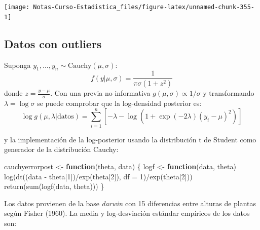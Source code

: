 \documentclass[
  12pt,
]{book}
\newenvironment{Shaded}{\begin{snugshade}}{\end{snugshade}}
\newcommand{\AttributeTok}[1]{\textcolor[rgb]{0.77,0.63,0.00}{#1}}
\newcommand{\ControlFlowTok}[1]{\textcolor[rgb]{0.13,0.29,0.53}{\textbf{#1}}}
\newcommand{\DecValTok}[1]{\textcolor[rgb]{0.00,0.00,0.81}{#1}}
\newcommand{\FunctionTok}[1]{\textcolor[rgb]{0.00,0.00,0.00}{#1}}
\newcommand{\NormalTok}[1]{#1}
\newcommand{\OtherTok}[1]{\textcolor[rgb]{0.56,0.35,0.01}{#1}}
\newcommand{\SpecialCharTok}[1]{\textcolor[rgb]{0.00,0.00,0.00}{#1}}
\theoremstyle{definition}
\theoremstyle{definition}
\theoremstyle{definition}
\theoremstyle{definition}
\theoremstyle{remark}
\begin{document}
\begin{center}\texttt{[image: Notas-Curso-Estadistica\_files/figure-latex/unnamed-chunk-355-1]} \end{center}

\hypertarget{datos-con-outliers}{%
\subsection{Datos con outliers}\label{datos-con-outliers}}

Suponga \(y_1,\ldots,y_n\sim \text{Cauchy}(\mu,\sigma)\):
\[f(y|\mu,\sigma)=\frac{1}{\pi\sigma(1+z^2)}\]
donde \(z=\frac{y-\mu}{\sigma}\). Con una previa no informativa \(g(\mu,\sigma)\propto 1/\sigma\) y transformando \(\lambda = \log \sigma\) se puede comprobar que la log-densidad posterior es:
\[\log g(\mu,\lambda|\text{datos}) = \sum_{i=1}^n\left[-\lambda-\log\left(1+\exp(-2\lambda)(y_i-\mu)^2\right)\right]\]

y la implementación de la log-posterior usando la distribución t de Student como generador de la distribución Cauchy:

\begin{Shaded}
\begin{Highlighting}[]
\NormalTok{cauchyerrorpost }\OtherTok{\textless{}{-}} \ControlFlowTok{function}\NormalTok{(theta, data) \{}
\NormalTok{    logf }\OtherTok{\textless{}{-}} \ControlFlowTok{function}\NormalTok{(data, theta) }\FunctionTok{log}\NormalTok{(}\FunctionTok{dt}\NormalTok{((data }\SpecialCharTok{{-}}\NormalTok{ theta[}\DecValTok{1}\NormalTok{])}\SpecialCharTok{/}\FunctionTok{exp}\NormalTok{(theta[}\DecValTok{2}\NormalTok{]),}
        \AttributeTok{df =} \DecValTok{1}\NormalTok{)}\SpecialCharTok{/}\FunctionTok{exp}\NormalTok{(theta[}\DecValTok{2}\NormalTok{]))}
    \FunctionTok{return}\NormalTok{(}\FunctionTok{sum}\NormalTok{(}\FunctionTok{logf}\NormalTok{(data, theta)))}
\NormalTok{\}}
\end{Highlighting}
\end{Shaded}

Los datos provienen de la base \emph{darwin} con 15 diferencias entre alturas de plantas según Fisher (1960). La media y log-desviación estándar empíricos de los datos son:

\begin{Shaded}
\end{Shaded}
\end{document}
